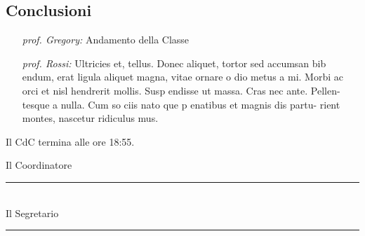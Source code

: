 \documentclass[11pt, a4paper]{exam}
\begin{document}
\subsection*{Conclusioni}
\begin{enumerate}[label=\roman*]
	\item [\em prof. Gregory:]Andamento della Classe
	\item [\em prof. Rossi:]Ultricies et, tellus. Donec aliquet, tortor sed accumsan bib endum, erat ligula aliquet magna, vitae ornare o dio metus a mi. Morbi ac orci et nisl hendrerit mollis. Susp endisse ut massa. Cras nec ante. Pellen- tesque a nulla. Cum so ciis nato que p enatibus et magnis dis partu- rient montes, nascetur ridiculus mus.
\end{enumerate}
Il CdC termina alle ore 18:55.

\vfill
\begin{center}
\begin{multicols}{2}
	Il Coordinatore\\[12pt] \rule{4cm}{0.4pt}\\
	Il Segretario\\[12pt]	\rule{4cm}{0.4pt}\\ 
	\end{multicols}
\end{center}

\end{document}
